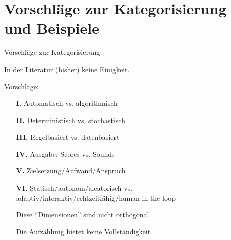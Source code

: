 \section{Vorschläge zur Kategorisierung und Beispiele}
\newcommand{\dimOneTitle}{Automatisch vs. algorithmisch}
\newcommand{\dimTwoTitle}{Deterministisch vs. stochastisch}
\newcommand{\dimThreeTitle}{Regelbasiert vs. datenbasiert}
\newcommand{\dimFourTitle}{Ausgabe: Scores vs. Sounds}
\newcommand{\dimFiveTitle}{Zielsetzung/Aufwand/Anspruch}
\newcommand{\dimSixTitle}{Statisch/autonom/aleatorisch vs. adaptiv/interaktiv/echtzeitfähig/human-in-the-loop}

\begin{frame}[t]{Vorschläge zur Kategorisierung}
	\vspace{-.5cm}
	\begin{center}
		In der Literatur (bisher) keine Einigkeit.
	\end{center}
	
	Vorschläge:
	\begin{itemize}
		\item[\textbf{I.}] \dimOneTitle 
		\item[\textbf{II.}] \dimTwoTitle
		\item[\textbf{III.}] \dimThreeTitle
		\item[\textbf{IV.}] \dimFourTitle
		\item[\textbf{V.}] \dimFiveTitle
		\item[\textbf{VI.}] \dimSixTitle
	\end{itemize}
	\medskip
	
	\begin{itemize}
		\item[\warnSign] Diese \enquote{Dimensionen} sind nicht orthogonal.
		\item[\warnSign] Die Aufzählung bietet keine Vollständigkeit.
	\end{itemize}
\end{frame}

